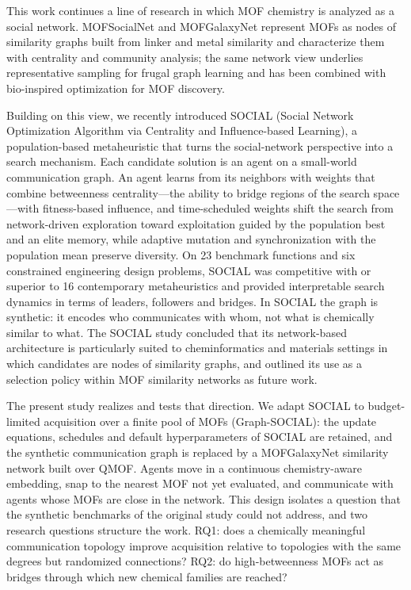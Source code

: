 \documentclass[journal=jcisd8,manuscript=article]{achemso}
\newcommand{\gs}{Graph-SOCIAL}
\begin{document}
This work continues a line of research in which MOF chemistry is analyzed as a social network. MOFSocialNet\cite{jalali2022mofsocialnet} and MOFGalaxyNet\cite{jalali2023mofgalaxynet} represent MOFs as nodes of similarity graphs built from linker and metal similarity and characterize them with centrality and community analysis; the same network view underlies representative sampling for frugal graph learning\cite{jalali2025blackhole} and has been combined with bio-inspired optimization for MOF discovery.\cite{jalali2025moflens}

Building on this view, we recently introduced SOCIAL (Social Network Optimization Algorithm via Centrality and Influence-based Learning),\cite{jalali2026social} a population-based metaheuristic that turns the social-network perspective into a search mechanism. Each candidate solution is an agent on a small-world communication graph.\cite{watts1998small} An agent learns from its neighbors with weights that combine betweenness centrality\cite{brandes2001faster}---the ability to bridge regions of the search space---with fitness-based influence, and time-scheduled weights shift the search from network-driven exploration toward exploitation guided by the population best and an elite memory, while adaptive mutation and synchronization with the population mean preserve diversity. On 23 benchmark functions and six constrained engineering design problems, SOCIAL was competitive with or superior to 16 contemporary metaheuristics and provided interpretable search dynamics in terms of leaders, followers and bridges.\cite{jalali2026social} In SOCIAL the graph is synthetic: it encodes who communicates with whom, not what is chemically similar to what. The SOCIAL study concluded that its network-based architecture is particularly suited to cheminformatics and materials settings in which candidates are nodes of similarity graphs, and outlined its use as a selection policy within MOF similarity networks as future work.\cite{jalali2026social}

The present study realizes and tests that direction. We adapt SOCIAL to budget-limited acquisition over a finite pool of MOFs (\gs{}): the update equations, schedules and default hyperparameters of SOCIAL are retained, and the synthetic communication graph is replaced by a MOFGalaxyNet similarity network built over QMOF. Agents move in a continuous chemistry-aware embedding, snap to the nearest MOF not yet evaluated, and communicate with agents whose MOFs are close in the network. This design isolates a question that the synthetic benchmarks of the original study could not address, and two research questions structure the work. RQ1: does a chemically meaningful communication topology improve acquisition relative to topologies with the same degrees but randomized connections? RQ2: do high-betweenness MOFs act as bridges through which new chemical families are reached?
\end{document}
